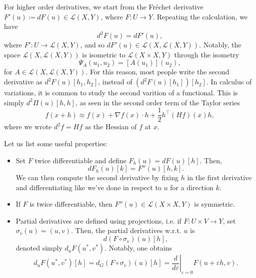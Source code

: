 For higher order derivatives, we start from the Fréchet derivative $F'(u) \coloneqq dF(u)\in \mathcal{L}(X,Y)$, where $F:U\to Y$. Repeating the calculation, we have
\begin{equation*}
    d^2 F(u) = dF'(u), 
\end{equation*} 
where $F': U\to \mathcal{L}(X,Y)$, and so $dF'(u) \in \mathcal{L}(X, \mathcal{L}(X,Y))$. Notably, the space $\mathcal{L}(X, \mathcal{L}(X,Y))$ is isometric to $\mathcal{L}(X\times X,Y)$ through the isometry
\begin{equation*}
    \Psi_A(u_1,u_2) = [A(u_1)](u_2),
\end{equation*} 
for $A\in \mathcal{L}(X,\mathcal{L}(X,Y))$. For this reason, most people write the second derivative as $d^2 F(u) [h_1,h_2]$, instead of $(d^2 F(u)[h_1])[h_2]$. In calculus of variations, it is common to study the second varition of a functional. This is simply $d^2 \Pi(u)[h,h]$, as seen in the second order term of the Taylor series
\begin{equation*}
    f(x+h)\approx f(x) + \nabla f(x) \cdot h + \frac{1}{2} h^\top (Hf)(x) h,
\end{equation*} 
where we wrote $d^2 f = Hf$ as the Hessian of $f$ at $x$.

Let us list some useful properties:
\begin{itemize}
    \item Set $F$ twice differentiable and define $F_h(u)=dF(u)[h]$. Then,
    \begin{equation}\label{eq:second-derivative-property}
        dF_h(u)[k] = F''(u)[h,k]. 
    \end{equation}
    We can then compute the second derivative by fixing $h$ in the first derivative and differentiating like we've done in respect to $u$ for a direction $k$.
    \item If $F$ is twice differentiable, then $F''(u)\in \mathcal{L}(X\times X, Y)$ is symmetric.
    \item Partial derivatives are defined using projections, i.e. if $F: U\times V \to Y$, set $\sigma_v(u)=(u,v)$. Then, the partial derivatives w.r.t. $u$ is
    \begin{equation*}
        d(F\circ \sigma_v)(u)[h],
    \end{equation*}
    denoted simply $d_u F(u^*,v^*)$. Notably, one obtains
    \begin{equation*}
        d_u F(u^*,v^*)[h] = d_G(F\circ \sigma_v)(u)[h] = \left.\frac{d}{d\varepsilon}\right|_{\varepsilon = 0} F(u+\varepsilon h, v).
    \end{equation*}
\end{itemize}


